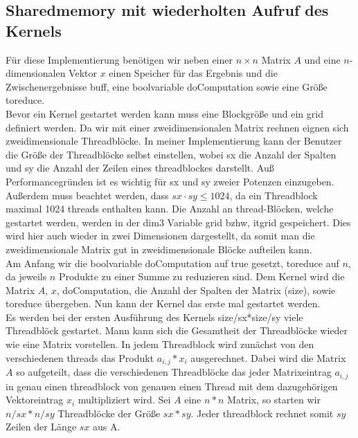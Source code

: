 \documentclass[10pt,a4paper]{article}
\begin{document}
	\subsection{Sharedmemory mit wiederholten Aufruf des Kernels}
	Für diese Implementierung benötigen wir neben einer $n\times n$ Matrix $A$ und eine $n$-dimensionalen Vektor $x$ einen Speicher für das Ergebnis und die Zwischenergebnisse buff, eine boolvariable doComputation sowie eine Größe toreduce.\\
	Bevor ein Kernel gestartet werden kann muss eine Blockgröße und ein grid definiert werden.
	 Da wir mit einer zweidimensionalen Matrix rechnen eignen sich zweidimensionale Threadblöcke.
	 In meiner Implementierung kann der Benutzer die Größe der Threadblöcke selbst einstellen, wobei sx die Anzahl der Spalten und sy die Anzahl der Zeilen eines threadblockes darstellt.
	 Auß Performancegründen ist es wichtig für sx und sy zweier Potenzen einzugeben. Außerdem muss beachtet werden, dass $sx\cdot sy\leq 1024$, da ein Threadblock maximal 1024 threads enthalten kann. Die Anzahl an thread-Blöcken, welche gestartet werden, werden in der dim3 Variable grid bzhw, itgrid gespeichert. Dies wird hier auch wieder in zwei Dimensionen dargestellt, da somit man die zweidimensionale Matrix gut in zweidimensionale Blöcke aufteilen kann. \\ 
	Am Anfang wir die boolvariable doComputation auf true gesetzt, toreduce auf $n$, da jeweils $n$ Produkte zu einer Summe zu reduzieren sind. Dem Kernel wird die Matrix $A$, $x$, doComputation, die Anzahl der Spalten der Matrix (size), sowie toreduce übergeben. Nun kann der Kernel das erste mal gestartet werden.\\
	Es werden bei der ersten Ausführung des Kernels size/sx*size/sy viele Threadblöck gestartet. Mann kann sich die Gesamtheit der Threadblöcke wieder wie eine Matrix vorstellen. In jedem Threadblock wird zunächst von den verschiedenen threads das Produkt $a_{i,j}*x_i$ ausgerechnet. Dabei wird die Matrix $A$ so aufgeteilt, dass die verschiedenen Threadblöcke das jeder Matrixeintrag $a_{i,j}$ in genau einen threadblock von genauen einen Thread mit dem dazugehörigen Vektoreintrag $x_i$ multipliziert wird. Sei $A$ eine $n*n$ Matrix, so starten wir $n/sx*n/sy$ Threadblöcke der Größe $sx*sy$. Jeder threadblock rechnet somit $sy$ Zeilen der Länge $sx$ aus A. 
\end{document}
